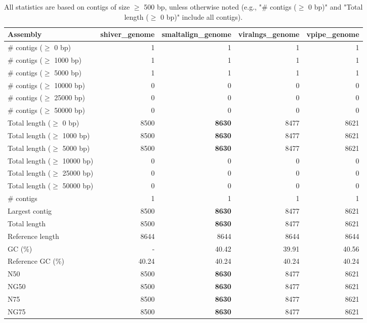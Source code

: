 \documentclass[12pt,a4paper]{article}
\begin{document}
\begin{table}[ht]
\begin{center}
\caption{All statistics are based on contigs of size $\geq$ 500 bp, unless otherwise noted (e.g., "\# contigs ($\geq$ 0 bp)" and "Total length ($\geq$ 0 bp)" include all contigs).}
\begin{tabular}{|l*{4}{|r}|}
\hline
Assembly & shiver\_genome & smaltalign\_genome & viralngs\_genome & vpipe\_genome \\ \hline
\# contigs ($\geq$ 0 bp) & 1 & 1 & 1 & 1 \\ \hline
\# contigs ($\geq$ 1000 bp) & 1 & 1 & 1 & 1 \\ \hline
\# contigs ($\geq$ 5000 bp) & 1 & 1 & 1 & 1 \\ \hline
\# contigs ($\geq$ 10000 bp) & 0 & 0 & 0 & 0 \\ \hline
\# contigs ($\geq$ 25000 bp) & 0 & 0 & 0 & 0 \\ \hline
\# contigs ($\geq$ 50000 bp) & 0 & 0 & 0 & 0 \\ \hline
Total length ($\geq$ 0 bp) & 8500 & {\bf 8630} & 8477 & 8621 \\ \hline
Total length ($\geq$ 1000 bp) & 8500 & {\bf 8630} & 8477 & 8621 \\ \hline
Total length ($\geq$ 5000 bp) & 8500 & {\bf 8630} & 8477 & 8621 \\ \hline
Total length ($\geq$ 10000 bp) & 0 & 0 & 0 & 0 \\ \hline
Total length ($\geq$ 25000 bp) & 0 & 0 & 0 & 0 \\ \hline
Total length ($\geq$ 50000 bp) & 0 & 0 & 0 & 0 \\ \hline
\# contigs & 1 & 1 & 1 & 1 \\ \hline
Largest contig & 8500 & {\bf 8630} & 8477 & 8621 \\ \hline
Total length & 8500 & {\bf 8630} & 8477 & 8621 \\ \hline
Reference length & 8644 & 8644 & 8644 & 8644 \\ \hline
GC (\%) & - & 40.42 & 39.91 & 40.56 \\ \hline
Reference GC (\%) & 40.24 & 40.24 & 40.24 & 40.24 \\ \hline
N50 & 8500 & {\bf 8630} & 8477 & 8621 \\ \hline
NG50 & 8500 & {\bf 8630} & 8477 & 8621 \\ \hline
N75 & 8500 & {\bf 8630} & 8477 & 8621 \\ \hline
NG75 & 8500 & {\bf 8630} & 8477 & 8621 \\ \hline

\end{tabular}
\end{center}
\end{table}
\end{document}
